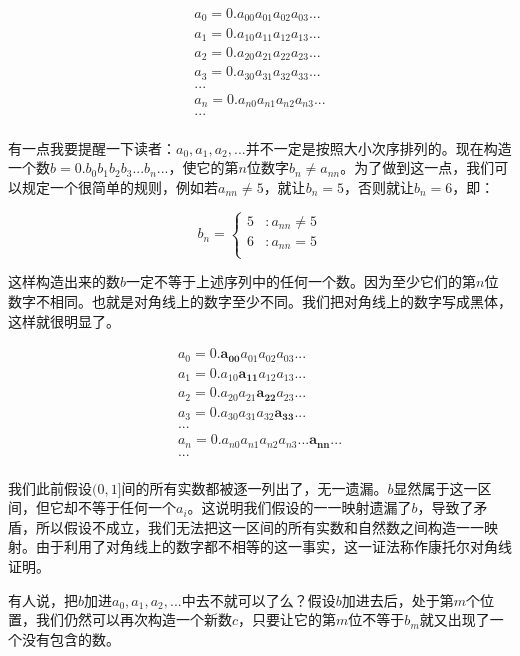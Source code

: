 \documentclass{article}
\begin{document}
\[
\begin{array}{l}
a_0 = 0.a_{00}a_{01}a_{02}a_{03}...\\
a_1 = 0.a_{10}a_{11}a_{12}a_{13}...\\
a_2 = 0.a_{20}a_{21}a_{22}a_{23}...\\
a_3 = 0.a_{30}a_{31}a_{32}a_{33}...\\
... \\
a_n = 0.a_{n0}a_{n1}a_{n2}a_{n3}...\\
... \\
\end{array}
\]

有一点我要提醒一下读者：$a_0, a_1, a_2, ...$并不一定是按照大小次序排列的。现在构造一个数$b = 0.b_0b_1b_2b_3...b_n...$，使它的第$n$位数字$b_n \neq a_{nn}$。为了做到这一点，我们可以规定一个很简单的规则，例如若$a_{nn} \neq 5$，就让$b_n = 5$，否则就让$b_n = 6$，即：

\[
b_n = \begin{cases}
5 & : a_{nn} \neq 5 \\
6 & : a_{nn} = 5 \\
\end{cases}
\]

这样构造出来的数$b$一定不等于上述序列中的任何一个数。因为至少它们的第$n$位数字不相同。也就是对角线上的数字至少不同。我们把对角线上的数字写成黑体，这样就很明显了。

\[
\begin{array}{l}
a_0 = 0.\pmb{a_{00}}a_{01}a_{02}a_{03}...\\
a_1 = 0.a_{10}\pmb{a_{11}}a_{12}a_{13}...\\
a_2 = 0.a_{20}a_{21}\pmb{a_{22}}a_{23}...\\
a_3 = 0.a_{30}a_{31}a_{32}\pmb{a_{33}}...\\
... \\
a_n = 0.a_{n0}a_{n1}a_{n2}a_{n3}...\pmb{a_{nn}}...\\
... \\
\end{array}
\]

我们此前假设$(0, 1]$间的所有实数都被逐一列出了，无一遗漏。$b$显然属于这一区间，但它却不等于任何一个$a_i$。这说明我们假设的一一映射遗漏了$b$，导致了矛盾，所以假设不成立，我们无法把这一区间的所有实数和自然数之间构造一一映射。由于利用了对角线上的数字都不相等的这一事实，这一证法称作康托尔对角线证明。

有人说，把$b$加进$a_0, a_1, a_2, ...$中去不就可以了么？假设$b$加进去后，处于第$m$个位置，我们仍然可以再次构造一个新数$c$，只要让它的第$m$位不等于$b_m$就又出现了一个没有包含的数。
\end{document}
